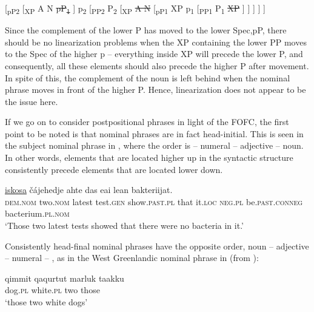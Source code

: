 \documentclass[output=paper]{LSP/langsci}
\begin{document}
\ex\relax\label{ex:julien:30b} 
[\textsubscript{pP2} 
  [\textsubscript{XP} 
    A 
    N 
    \sout{pP\textsubscript{1}}
  ] 
  p\textsubscript{2} 
  [\textsubscript{PP2} 
    P\textsubscript{2} 
    [\textsubscript{XP} 
      \sout{A N} 
      [\textsubscript{pP1} 
	XP 
	p\textsubscript{1} 
	[\textsubscript{PP1} 
	    P\textsubscript{1} 
	    \sout{XP}
	]
      ]
    ]
  ]
]
\z
\z 

Since the complement of the lower P has moved to the lower Spec,pP, there should be no linearization problems when the XP containing the lower PP moves to the Spec of the higher p – everything inside XP will precede the lower P, and consequently, all these elements should also precede the higher P after movement. In spite of this, the complement of the noun is left behind when the nominal phrase moves in front of the higher P. Hence, linearization does not appear to be the issue here.


If we go on to consider  postpositional phrases in light of the FOFC, the first point to be noted is that  nominal phrases are in fact head-initial. This is seen in the subject nominal phrase in , where the order is  – numeral – adjective – noun. In other words, elements that are located higher up in the syntactic structure consistently precede elements that are located lower down. 


\ea%
    \label{ex:julien:31}
   
    \gll    {}            \uline{iskosa}  čájehedje     ahte  das    eai      lean          bakteriijat.\\ 
	\textsc{dem.nom}  two.\textsc{nom}  latest      test.\textsc{gen}  show.\textsc{past.pl}    that  it.\textsc{loc}  \textsc{neg.pl}  be.\textsc{past.conneg} bacterium.\textsc{pl.nom}\\
    \glt  ‘Those two latest tests showed that there were no bacteria in it.’
    \z


Consistently head-final nominal phrases have the opposite order, noun – adjective – numeral – , as in the West Greenlandic nominal phrase in  (from \citealt[118]{Fortescue1984}):

\ea%
    \label{ex:julien:32}
   
    \gll    qimmit  qaqurtut    marluk  taakku  \\ 
	  dog.\textsc{pl}  white.\textsc{pl}    two    those\\
    \glt   ‘those two white dogs’
    \z
\end{document}
